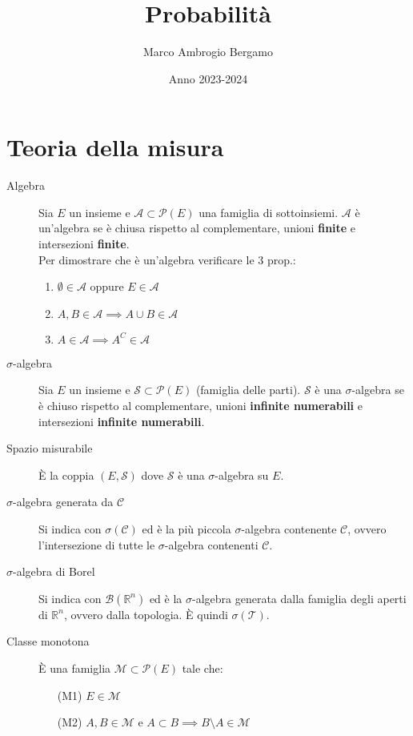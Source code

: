 \documentclass[a4paper,10pt]{article}
\title{Probabilità}
\author{Marco Ambrogio Bergamo}
\date{Anno 2023-2024}
\theoremstyle{remark}
\theoremstyle{definition}
\begin{document}
\maketitle



\part{Teoria della misura}
\begin{description}
    \item[Algebra] Sia  $E$ un insieme e $\mathcal{A}\subset \mathcal{P}(E)$ una famiglia di sottoinsiemi.  $\mathcal{A}$ è un'algebra se è chiusa rispetto al complementare, unioni \textbf{finite} e intersezioni \textbf{finite}. \\
    Per dimostrare che è  un'algebra verificare le 3 prop.:
      \begin{enumerate}
        \item $\emptyset \in \mathcal{A}$ oppure $E \in \mathcal{A}$
        \item $A,B\in \mathcal{A} \implies A \cup B \in \mathcal{A}$
        \item $A\in \mathcal{A} \implies A^C \in \mathcal{A}$ 
    \end{enumerate}
    \item[$\sigma$-algebra] Sia  $E$ un insieme e $\mathcal{S}\subset \mathcal{P}(E)$ (famiglia delle parti).  $\mathcal{S}$ è una $\sigma$-algebra se è chiuso rispetto al complementare, unioni \textbf{infinite numerabili} e intersezioni \textbf{infinite numerabili}.
    \item[Spazio misurabile] È la coppia $(E, \mathcal{S})$ dove $\mathcal{S}$ è una $\sigma$-algebra su $E$.
    \item[$\sigma$-algebra generata da $\mathcal{C}$] Si indica con $\sigma(\mathcal{C})$ ed è la più piccola $\sigma$-algebra contenente  $\mathcal{C}$, ovvero l'intersezione di tutte le $\sigma$-algebra contenenti $\mathcal{C}$.
    \item[$\sigma$-algebra di Borel] Si indica con $\mathcal{B}(\mathbb{R}^n)$ ed è la  $\sigma$-algebra generata dalla famiglia degli aperti di $\mathbb{R}^n$, ovvero dalla topologia. È quindi  $\sigma(\mathcal{T})$.
    \item[Classe monotona] È una famiglia $\mathcal{M}\subset \mathcal{P}(E)$ tale che:
    \begin{itemize}
        \item[(M1)] $E\in \mathcal{M}$
        \item[(M2)]  $A,B\in \mathcal{M}$ e $A\subset B \implies B\setminus A \in \mathcal{M}$

\end{itemize}
\end{description}
\end{document}
